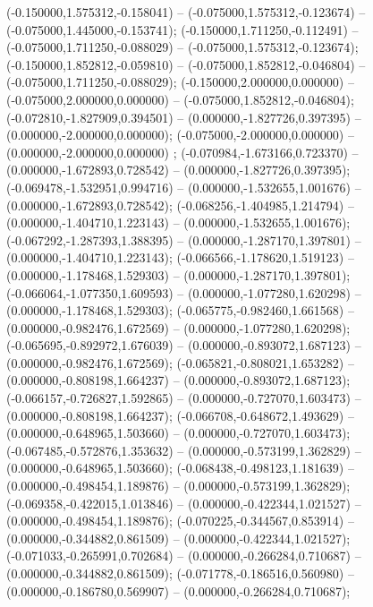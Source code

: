  (-0.150000,1.575312,-0.158041) -- (-0.075000,1.575312,-0.123674) -- (-0.075000,1.445000,-0.153741);
 (-0.150000,1.711250,-0.112491) -- (-0.075000,1.711250,-0.088029) -- (-0.075000,1.575312,-0.123674);
 (-0.150000,1.852812,-0.059810) -- (-0.075000,1.852812,-0.046804) -- (-0.075000,1.711250,-0.088029);
 (-0.150000,2.000000,0.000000) -- (-0.075000,2.000000,0.000000) -- (-0.075000,1.852812,-0.046804);
 (-0.072810,-1.827909,0.394501) -- (0.000000,-1.827726,0.397395) -- (0.000000,-2.000000,0.000000);
 (-0.075000,-2.000000,0.000000) -- (0.000000,-2.000000,0.000000) ;
 (-0.070984,-1.673166,0.723370) -- (0.000000,-1.672893,0.728542) -- (0.000000,-1.827726,0.397395);
 (-0.069478,-1.532951,0.994716) -- (0.000000,-1.532655,1.001676) -- (0.000000,-1.672893,0.728542);
 (-0.068256,-1.404985,1.214794) -- (0.000000,-1.404710,1.223143) -- (0.000000,-1.532655,1.001676);
 (-0.067292,-1.287393,1.388395) -- (0.000000,-1.287170,1.397801) -- (0.000000,-1.404710,1.223143);
 (-0.066566,-1.178620,1.519123) -- (0.000000,-1.178468,1.529303) -- (0.000000,-1.287170,1.397801);
 (-0.066064,-1.077350,1.609593) -- (0.000000,-1.077280,1.620298) -- (0.000000,-1.178468,1.529303);
 (-0.065775,-0.982460,1.661568) -- (0.000000,-0.982476,1.672569) -- (0.000000,-1.077280,1.620298);
 (-0.065695,-0.892972,1.676039) -- (0.000000,-0.893072,1.687123) -- (0.000000,-0.982476,1.672569);
 (-0.065821,-0.808021,1.653282) -- (0.000000,-0.808198,1.664237) -- (0.000000,-0.893072,1.687123);
 (-0.066157,-0.726827,1.592865) -- (0.000000,-0.727070,1.603473) -- (0.000000,-0.808198,1.664237);
 (-0.066708,-0.648672,1.493629) -- (0.000000,-0.648965,1.503660) -- (0.000000,-0.727070,1.603473);
 (-0.067485,-0.572876,1.353632) -- (0.000000,-0.573199,1.362829) -- (0.000000,-0.648965,1.503660);
 (-0.068438,-0.498123,1.181639) -- (0.000000,-0.498454,1.189876) -- (0.000000,-0.573199,1.362829);
 (-0.069358,-0.422015,1.013846) -- (0.000000,-0.422344,1.021527) -- (0.000000,-0.498454,1.189876);
 (-0.070225,-0.344567,0.853914) -- (0.000000,-0.344882,0.861509) -- (0.000000,-0.422344,1.021527);
 (-0.071033,-0.265991,0.702684) -- (0.000000,-0.266284,0.710687) -- (0.000000,-0.344882,0.861509);
 (-0.071778,-0.186516,0.560980) -- (0.000000,-0.186780,0.569907) -- (0.000000,-0.266284,0.710687);
